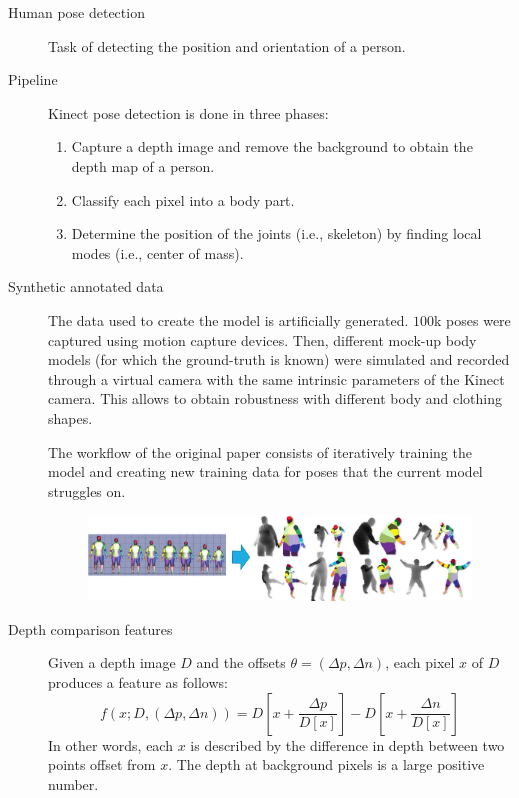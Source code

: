 \begin{description}
    \item[Human pose detection] 
        Task of detecting the position and orientation of a person.

    \item[Pipeline]
        Kinect pose detection is done in three phases:
        \begin{enumerate}
            \item Capture a depth image and remove the background to obtain the depth map of a person.
            \item Classify each pixel into a body part.
            \item Determine the position of the joints (i.e., skeleton) by finding local modes (i.e., center of mass).
        \end{enumerate}

    \item[Synthetic annotated data] 
        The data used to create the model is artificially generated. $100$k poses were captured using motion capture devices. Then, different mock-up body models (for which the ground-truth is known) were simulated and recorded through a virtual camera with the same intrinsic parameters of the Kinect camera. This allows to obtain robustness with different body and clothing shapes.

        \begin{remark}
            The workflow of the original paper consists of iteratively training the model and creating new training data for poses that the current model struggles on.
        \end{remark}

        \begin{figure}[H]
            \centering
            \includegraphics[width=0.75\linewidth]{./img/motion_data.jpg}
        \end{figure}

    \item[Depth comparison features] 
        Given a depth image $D$ and the offsets $\theta = (\Delta p, \Delta n)$, each pixel $x$ of $D$ produces a feature as follows:
        \[ f(x; D, (\Delta p, \Delta n)) = D\left[ x + \frac{\Delta p}{D[x]} \right] - D\left[ x + \frac{\Delta n}{D[x]} \right] \]
        In other words, each $x$ is described by the difference in depth between two points offset from $x$. The depth at background pixels is a large positive number.


\end{description}
